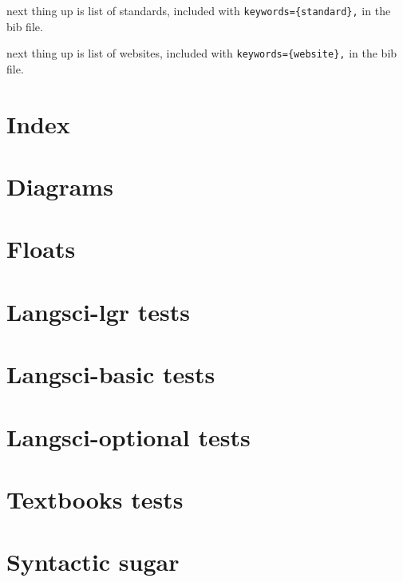 \documentclass[output=book
  ,colorlinks
  ,showindex
  ,draftmode
  ,openreview
  ,nobabel
  ,booklanguage=italian
  ,oldstylenumbers
  ,multiauthors
  ,biblatex
  ,tblseight
  ]{langscibook}
\begin{document}
\printbibliography[notkeyword={techreport},notkeyword={website},title={References}]

next thing up is list of standards, included with \verb+keywords={standard},+ in the bib file.

\printbibliography[keyword={standard},title={Standards}]



next thing up is list of websites, included with \verb+keywords={website},+ in the bib file.

\printbibliography[keyword={website},title={Websites}]



\section{Index}


\section{Diagrams}


\section{Floats}



%
\section{Langsci-lgr tests}


\section{Langsci-basic tests}
% 

\section{Langsci-optional tests}
% 

\section{Textbooks tests}
% 
% 
% 

\section{Syntactic sugar}


\end{document}
